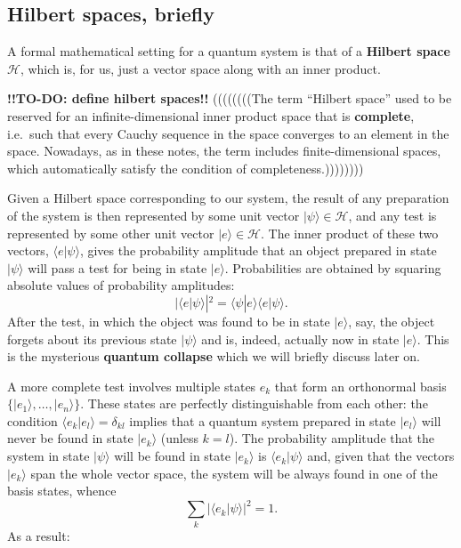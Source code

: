 \documentclass[fleqn]{article}
\begin{document}
\hypertarget{hilbert-spaces-briefly}{%
\subsection{Hilbert spaces, briefly}\label{hilbert-spaces-briefly}}

A formal mathematical setting for a quantum system is that of a \textbf{Hilbert space} \(\mathcal{H}\), which is, for us, just a vector space along with an inner product.

\textbf{!!TO-DO: define hilbert spaces!!}
((((((((The term ``Hilbert space'' used to be reserved for an infinite-dimensional inner product space that is \textbf{complete}, i.e.~such that every Cauchy sequence in the space converges to an element in the space. Nowadays, as in these notes, the term includes finite-dimensional spaces, which automatically satisfy the condition of completeness.))))))))

Given a Hilbert space corresponding to our system, the result of any preparation of the system is then represented by some unit vector \(|\psi\rangle\in \mathcal{H}\), and any test is represented by some other unit vector \(|e\rangle\in \mathcal{H}\).
The inner product of these two vectors, \(\langle e|\psi\rangle\), gives the probability amplitude that an object prepared in state \(|\psi\rangle\) will pass a test for being in state \(|e\rangle\).
Probabilities are obtained by squaring absolute values of probability amplitudes:
\[
  |\langle e|\psi\rangle|^2
  = \langle\psi|e\rangle\langle e|\psi\rangle.
\]
After the test, in which the object was found to be in state \(|e\rangle\), say, the object forgets about its previous state \(|\psi\rangle\) and is, indeed, actually now in state \(|e\rangle\).
This is the mysterious \textbf{quantum collapse} which we will briefly discuss later on.

A more complete test involves multiple states \(e_k\) that form an orthonormal basis \(\{|e_1\rangle,\ldots,|e_n\rangle\}\).
These states are perfectly distinguishable from each other: the condition \(\langle e_k|e_l\rangle = \delta_{kl}\) implies that a quantum system prepared in state \(|e_l\rangle\) will never be found in state \(|e_k\rangle\) (unless \(k=l\)).
The probability amplitude that the system in state \(|\psi\rangle\) will be found in state \(|e_k\rangle\) is \(\langle e_k|\psi\rangle\) and, given that the vectors \(|e_k\rangle\) span the whole vector space, the system will be always found in one of the basis states, whence
\[
  \sum_k |\langle e_k|\psi\rangle|^2 = 1.
\]
As a result:
\end{document}
